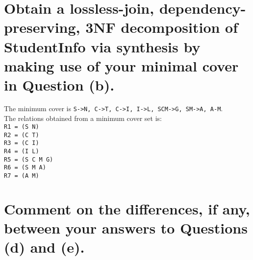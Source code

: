 \documentclass{article}
\begin{document}
\section{Obtain a lossless-join, dependency-preserving, 3NF decomposition of StudentInfo via
synthesis by making use of your minimal cover in Question (b).}
The minimum cover is \texttt{S->N, C->T, C->I, I->L, SCM->G, SM->A, A-M}.\\
The relations obtained from a minimum cover set is:\\
\texttt{R1 = (S N)}\\
\texttt{R2 = (C T)}\\
\texttt{R3 = (C I)}\\
\texttt{R4 = (I L)}\\
\texttt{R5 = (S C M G)}\\
\texttt{R6 = (S M A)}\\
\texttt{R7 = (A M)}\\



\section{Comment on the differences, if any, between your answers to Questions (d) and (e).}
\end{document}
